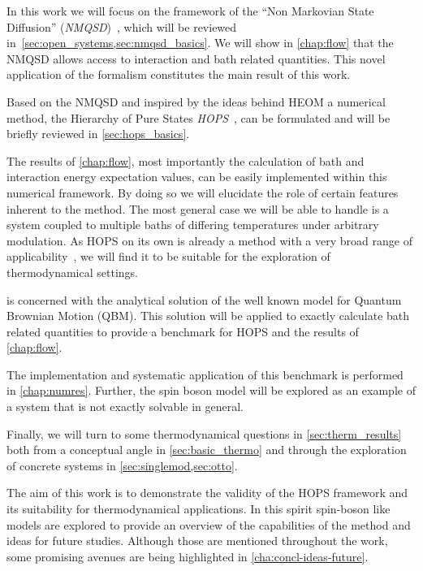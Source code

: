 In this work we will focus on the framework of the ``Non Markovian
State Diffusion'' (\emph{NMQSD})~\cite{Diosi1998Mar}, which will be
reviewed in~\cref{sec:open_systems,sec:nmqsd_basics}. We will show in
\cref{chap:flow} that the NMQSD allows access to interaction and bath
related quantities. This novel application of the formalism
constitutes the main result of this work.

Based on the NMQSD and inspired by the ideas behind HEOM a numerical
method, the Hierarchy of Pure States
\emph{HOPS}~\cite{RichardDiss,Hartmann2017Dec}, can be formulated and
will be briefly reviewed in \cref{sec:hops_basics}.

The results of \cref{chap:flow}, most importantly the calculation of
bath and interaction energy expectation values, can be easily
implemented within this numerical framework. By doing so we will
elucidate the role of certain features inherent to the method. The
most general case we will be able to handle is a system coupled to
multiple baths of differing temperatures under arbitrary
modulation. As HOPS on its own is already a method with a very broad
range of applicability~\cite{RichardDiss}, we will find it to be
suitable for the exploration of thermodynamical settings.

 is concerned with the analytical solution of the
well known model for Quantum Brownian Motion (QBM). This solution will
be applied to exactly calculate bath related quantities to provide a
benchmark for HOPS and the results of \cref{chap:flow}.

The implementation and systematic application of this benchmark is
performed in \cref{chap:numres}. Further, the spin boson model will be
explored as an example of a system that is not exactly solvable in
general.

Finally, we will turn to some thermodynamical questions in
\cref{sec:therm_results} both from a conceptual angle in
\cref{sec:basic_thermo} and through the exploration of concrete
systems in \cref{sec:singlemod,sec:otto}.

The aim of this work is to demonstrate the validity of the HOPS
framework and its suitability for thermodynamical applications. In
this spirit spin-boson like models are explored to provide an overview
of the capabilities of the method and ideas for future
studies. Although those are mentioned throughout the work, some
promising avenues are being highlighted in
\cref{cha:concl-ideas-future}.

